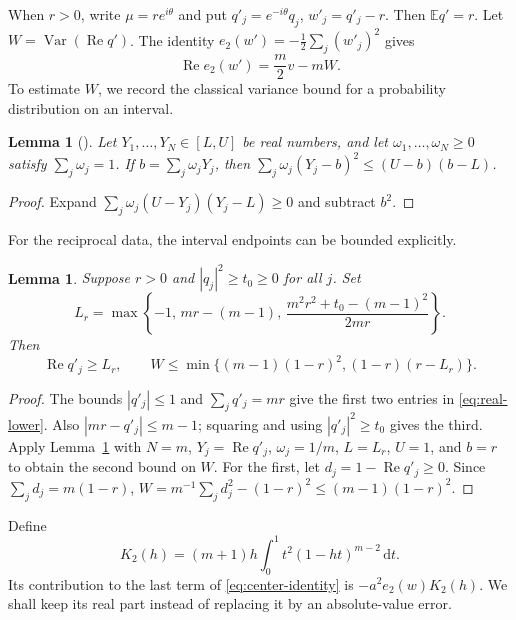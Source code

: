 \documentclass[11pt,reqno]{amsart}
\newtheorem{lem}[thm]{Lemma}
\theoremstyle{definition}
\theoremstyle{remark}
\numberwithin{equation}{section}
\newcommand{\E}{\mathbb E}
\newcommand{\dd}{\,\mathrm d}
\newcommand{\Var}{\operatorname{Var}}
\newcommand{\Rea}{\operatorname{Re}}
\begin{document}
When $r>0$, write $\mu=re^{i\theta}$ and put
$q'_j=e^{-i\theta}q_j$, $w'_j=q'_j-r$. Then $\E q'=r$. Let $W=\Var(\Rea q')$. The identity $e_2(w')=-\tfrac12\sum_j(w'_j)^2$ gives
\begin{equation}\label{eq:quadratic-real}
 \Rea e_2(w')=\frac m2v-mW.
\end{equation}
To estimate $W$, we record the classical variance bound for a probability distribution on an interval.

\begin{lem}[{\cite[p.~353]{BD00}}]\label{lem:bd}
Let $Y_1,\ldots,Y_N\in[L,U]$ be real numbers, and let $\omega_1,\ldots,\omega_N\ge0$ satisfy $\sum_j\omega_j=1$. If $b=\sum_j\omega_jY_j$, then
$\sum_j\omega_j(Y_j-b)^2\le(U-b)(b-L)$.
\end{lem}
\begin{proof}
Expand $\sum_j\omega_j(U-Y_j)(Y_j-L)\ge0$ and subtract $b^2$.
\end{proof}

For the reciprocal data, the interval endpoints can be bounded explicitly.

\begin{lem}\label{lem:real-variance}
Suppose $r>0$ and $|q_j|^2\ge t_0\ge0$ for all $j$. Set
\begin{equation}\label{eq:real-lower}
 L_r=\max\left\{-1,\,mr-(m-1),\,
 \frac{m^2r^2+t_0-(m-1)^2}{2mr}\right\}.
\end{equation}
Then
\begin{equation}\label{eq:real-variance}
 \Rea q'_j\ge L_r,\qquad
 W\le\min\{(m-1)(1-r)^2,(1-r)(r-L_r)\}.
\end{equation}
\end{lem}
\begin{proof}
The bounds $|q'_j|\le1$ and $\sum_jq'_j=mr$ give the first two entries in \eqref{eq:real-lower}. Also $|mr-q'_j|\le m-1$; squaring and using $|q'_j|^2\ge t_0$ gives the third.
Apply Lemma~\ref{lem:bd} with $N=m$, $Y_j=\Rea q'_j$, $\omega_j=1/m$, $L=L_r$, $U=1$, and $b=r$ to obtain the second bound on $W$. For the first, let $d_j=1-\Rea q'_j\ge0$. Since $\sum_jd_j=m(1-r)$,
$W=m^{-1}\sum_jd_j^2-(1-r)^2\le(m-1)(1-r)^2$.
\end{proof}

Define
\begin{equation}\label{eq:K2}
 K_2(h)=(m+1)h\int_0^1t^2(1-ht)^{m-2}\dd t.
\end{equation}
Its contribution to the last term of \eqref{eq:center-identity} is $-a^2e_2(w)K_2(h)$. We shall keep its real part instead of replacing it by an absolute-value error.
\end{document}

